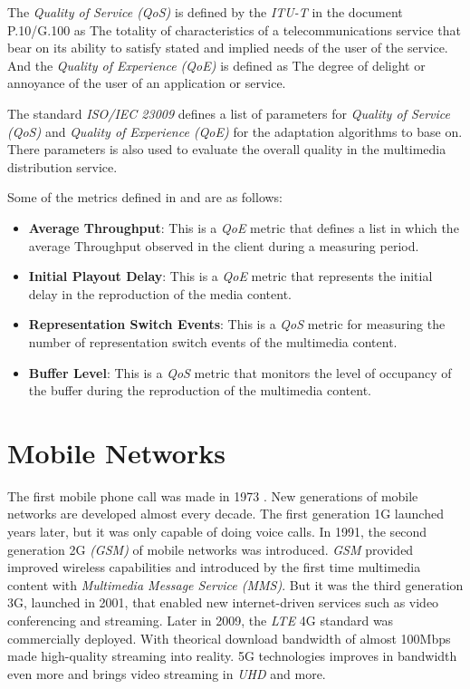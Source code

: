 The \textit{Quality of Service (QoS)} is defined by the \textit{ITU-T} in the document P.10/G.100
 \cite{itu2} as \textquotedbl The totality of characteristics of a telecommunications service that bear on its 
 ability to satisfy stated and implied needs of the user of the service\textquotedbl. And the \textit{Quality of 
Experience (QoE)} is defined as \textquotedbl The degree of delight or annoyance of the user of an application or service\textquotedbl.

The standard \textit{ISO/IEC 23009} defines a list of parameters for \textit{Quality of Service (QoS)} and
\textit{Quality of Experience (QoE)} for the adaptation algorithms to base on. There parameters 
is also used to evaluate the overall quality in the multimedia distribution service.

Some of the metrics defined in \cite{3gpp1} and \cite{ISO23009} are as follows:

\begin{itemize}
  \item \textbf{Average Throughput}: This is a \textit{QoE} metric that defines a list in which 
  the average Throughput observed in the client during a measuring period.
  \item \textbf{Initial Playout Delay}: This is a \textit{QoE} metric that represents the initial 
  delay in the reproduction of the media content.
  \item \textbf{Representation Switch Events}: This is a \textit{QoS} metric for measuring the 
  number of representation switch events of the multimedia content.
  \item \textbf{Buffer Level}: This is a \textit{QoS} metric that monitors the level of occupancy
  of the buffer during the reproduction of the multimedia content.
\end{itemize}


\section{Mobile Networks}
\label{sec:mobile}

The first mobile phone call was made in 1973 \cite{mob1}. New generations of mobile networks 
are developed almost every decade. The first generation 1G launched years later, but
it was only capable of doing voice calls. In 1991, the second generation 2G \textit{(GSM)} of 
mobile networks was introduced. \textit{GSM} provided improved wireless capabilities and 
introduced by the first time multimedia content with \textit{Multimedia Message Service (MMS)}.
But it was the third generation 3G, launched in 2001, that enabled new internet-driven
services such as video conferencing and streaming. Later in 2009, the \textit{LTE} 4G standard
was commercially deployed. With theorical download bandwidth of almost 100Mbps made high-quality
streaming into reality. 5G technologies improves in bandwidth even more and brings 
video streaming in \textit{UHD} and more.

